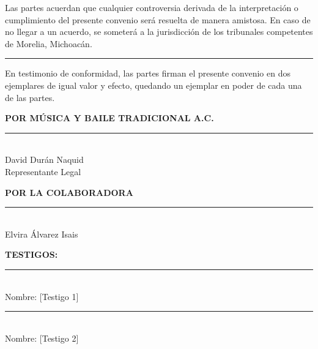 \documentclass[a4paper,12pt]{article}
\begin{document}
Las partes acuerdan que cualquier controversia derivada de la interpretación o cumplimiento del presente convenio será resuelta de manera amistosa. En caso de no llegar a un acuerdo, se someterá a la jurisdicción de los tribunales competentes de Morelia, Michoacán.

\vspace{0.5cm}
\hrule
\vspace{0.5cm}

En testimonio de conformidad, las partes firman el presente convenio en dos ejemplares de igual valor y efecto, quedando un ejemplar en poder de cada una de las partes.

\vspace{1cm}

\textbf{POR MÚSICA Y BAILE TRADICIONAL A.C.} \\
\rule{10cm}{0.4pt} \\
David Durán Naquid \\
Representante Legal

\vspace{1cm}

\textbf{POR LA COLABORADORA} \\
\rule{10cm}{0.4pt} \\
Elvira Álvarez Isais

\vspace{1cm}

\textbf{TESTIGOS:} \\[0.5cm]
\rule{10cm}{0.4pt} \\
Nombre: [Testigo 1] \\[1cm]
\rule{10cm}{0.4pt} \\
Nombre: [Testigo 2]
\end{document}

